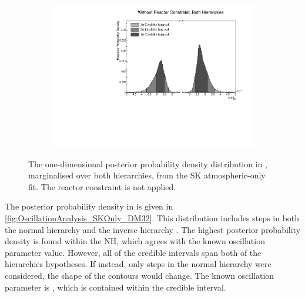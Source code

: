 \begin{figure}[h]
  \begin{subfigure}[t]{0.98\textwidth}
    \includegraphics[width=\textwidth, trim={0mm 0mm 0mm 0mm}, clip,page=1]{Figures/OA/SKOnlyFit/Contours_1D_dm32_BH_1_woRC_UnSmeared_CredibleInterval.pdf}
  \end{subfigure}
  \caption{The one-dimensional posterior probability density distribution in , marginalised over both hierarchies, from the SK atmospheric-only fit. The reactor constraint is not applied.}
  \label{fig:OscillationAnalysis_SKOnly_DM32}
\end{figure}

The posterior probability density in  is given in \autoref{fig:OscillationAnalysis_SKOnly_DM32}. This distribution includes steps in both the normal hierarchy  and the inverse hierarchy . The highest posterior probability density is found within the NH, which agrees with the known oscillation parameter value. However, all of the credible intervals span both of the hierarchies hypotheses. If instead, only steps in the normal hierarchy were considered, the shape of the contours would change. The known oscillation parameter is , which is contained within the \quickmath{1\sigma} credible interval.

